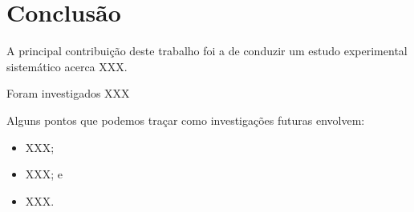 \chapter{Conclusão}
\label{conc}
\thispagestyle{plain}

A principal contribuição deste trabalho foi a de conduzir um estudo experimental sistemático acerca XXX. 

Foram investigados XXX

Alguns pontos que podemos traçar como investigações futuras envolvem:

\begin{itemize}
\item XXX;
\item XXX; e
\item XXX.
\end{itemize}
